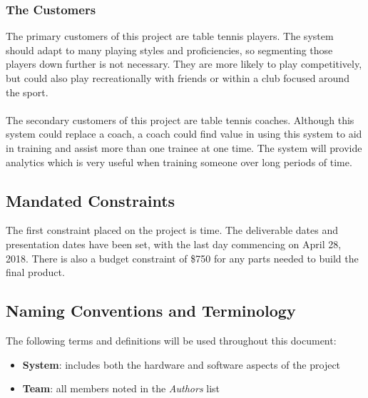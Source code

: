 \documentclass[11pt]{article}
\begin{document}
\subsubsection{The Customers}
The primary customers of this project are table tennis players. The system should adapt to many playing styles and proficiencies, so segmenting those players down further is not necessary. They are more likely to play competitively, but could also play recreationally with friends or within a club focused around the sport. \\\\
The secondary customers of this project are table tennis coaches. Although this system could replace a coach, a coach could find value in using this system to aid in training and assist more than one trainee at one time. The system will provide analytics which is very useful when training someone over long periods of time.
\subsection{Mandated Constraints}
The first constraint placed on the project is time. The deliverable dates and presentation dates have been set, with the last day commencing on April 28, 2018. There is also a budget constraint of \$750 for any parts needed to build the final product.
\subsection{Naming Conventions and Terminology}
The following terms and definitions will be used throughout this document:
\begin{itemize}
\item \textbf{System}: includes both the hardware and software aspects of the project
\item \textbf{Team}: all members noted in the \textit{Authors} list
\end{itemize}
\end{document}
